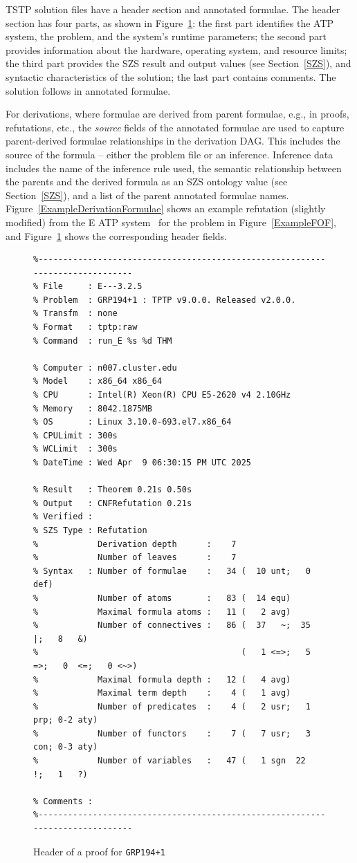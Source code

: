 \documentclass[runningheads]{llncs}
\begin{document}
TSTP solution files have a header section and annotated formulae.
The header section has four parts, as shown in Figure~\ref{ExampleDerivationHeader}:
the first part identifies the ATP system, the problem, and the system's runtime parameters; 
the second part provides information about the hardware, operating system, and resource limits; 
the third part provides the SZS result and output values (see Section~\ref{SZS}), and syntactic 
characteristics of the solution; the last part contains comments.
The solution follows in annotated formulae.

For derivations, where formulae are derived from parent formulae, e.g., in proofs, refutations, 
etc., the {\em source} fields of the annotated formulae are used to capture parent-derived 
formulae relationships in the derivation DAG.
This includes the source of the formula -- either the problem file or an inference.
Inference data includes the name of the inference rule used, the semantic relationship between 
the parents and the derived formula as an SZS ontology value (see Section~\ref{SZS}), and a 
list of the parent annotated formulae names.
Figure~\ref{ExampleDerivationFormulae} shows an example refutation (slightly modified) from 
the E ATP system~\cite{SCV19} for the problem in Figure~\ref{ExampleFOF}, and 
Figure~\ref{ExampleDerivationHeader} shows the corresponding header fields.

\begin{figure}[htb]
\centering
{\scriptsize
{\setlength{\baselineskip}{2.5mm}
\begin{verbatim}
%------------------------------------------------------------------------------
% File     : E---3.2.5
% Problem  : GRP194+1 : TPTP v9.0.0. Released v2.0.0.
% Transfm  : none
% Format   : tptp:raw
% Command  : run_E %s %d THM

% Computer : n007.cluster.edu
% Model    : x86_64 x86_64
% CPU      : Intel(R) Xeon(R) CPU E5-2620 v4 2.10GHz
% Memory   : 8042.1875MB
% OS       : Linux 3.10.0-693.el7.x86_64
% CPULimit : 300s
% WCLimit  : 300s
% DateTime : Wed Apr  9 06:30:15 PM UTC 2025

% Result   : Theorem 0.21s 0.50s
% Output   : CNFRefutation 0.21s
% Verified : 
% SZS Type : Refutation
%            Derivation depth      :    7
%            Number of leaves      :    7
% Syntax   : Number of formulae    :   34 (  10 unt;   0 def)
%            Number of atoms       :   83 (  14 equ)
%            Maximal formula atoms :   11 (   2 avg)
%            Number of connectives :   86 (  37   ~;  35   |;   8   &)
%                                         (   1 <=>;   5  =>;   0  <=;   0 <~>)
%            Maximal formula depth :   12 (   4 avg)
%            Maximal term depth    :    4 (   1 avg)
%            Number of predicates  :    4 (   2 usr;   1 prp; 0-2 aty)
%            Number of functors    :    7 (   7 usr;   3 con; 0-3 aty)
%            Number of variables   :   47 (   1 sgn  22   !;   1   ?)

% Comments : 
%------------------------------------------------------------------------------
\end{verbatim}
}}
\caption{Header of a proof for {\tt GRP194+1}}
\label{ExampleDerivationHeader}
\end{figure}
\end{document}

